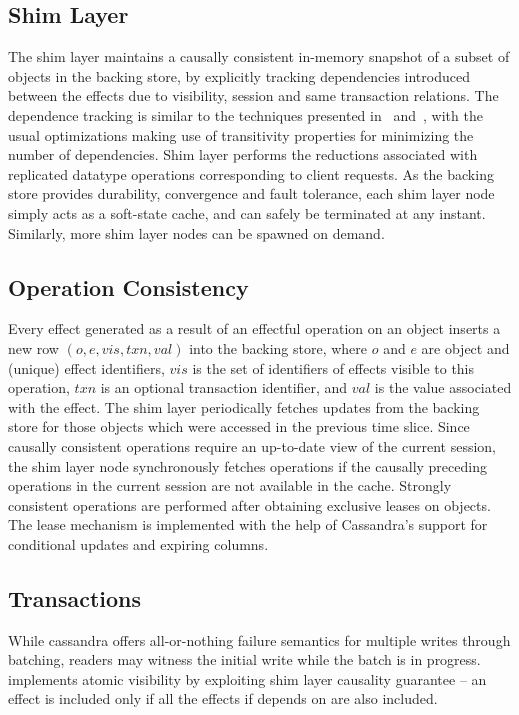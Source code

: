 \subsection{Shim Layer}

The shim layer maintains a causally consistent in-memory snapshot of a subset
of objects in the backing store, by explicitly tracking dependencies introduced
between the effects due to visibility, session and same transaction relations.
The dependence tracking is similar to the techniques presented in~\cite{BoltOn}
and~\cite{Eiger}, with the usual optimizations making use of transitivity
properties for minimizing the number of dependencies. Shim layer performs the
reductions associated with replicated datatype operations corresponding to
client requests. As the backing store provides durability, convergence and
fault tolerance, each shim layer node simply acts as a soft-state cache, and
can safely be terminated at any instant. Similarly, more shim layer nodes can
be spawned on demand.

\subsection{Operation Consistency}

Every effect generated as a result of an effectful operation on an object
inserts a new row $(o,e,vis,txn,val)$ into the backing store, where $o$ and $e$
are object and (unique) effect identifiers, $vis$ is the set of identifiers of
effects visible to this operation, $txn$ is an optional transaction identifier,
and $val$ is the value associated with the effect. The shim layer periodically
fetches updates from the backing store for those objects which were accessed in
the previous time slice. Since causally consistent operations require an
up-to-date view of the current session, the shim layer node synchronously
fetches operations if the causally preceding operations in the current session
are not available in the cache. Strongly consistent operations are performed
after obtaining exclusive leases on objects. The lease mechanism is implemented
with the help of Cassandra's support for conditional updates and expiring
columns.

\subsection{Transactions}

While cassandra offers all-or-nothing failure semantics for multiple writes
through batching, readers may witness the initial write while the batch is in
progress. \name implements atomic visibility by exploiting shim layer causality
guarantee -- an effect is included only if all the effects if depends on are
also included.

